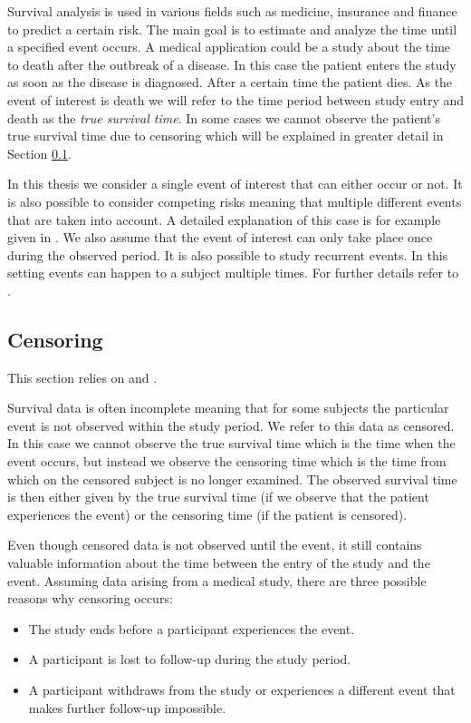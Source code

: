 \documentclass[12pt, a4paper]{scrartcl}
\theoremstyle{definition}
\theoremstyle{plain}
\numberwithin{equation}{section}
\numberwithin{figure}{section}
\numberwithin{table}{section}
\begin{document}
	Survival analysis is used in various fields such as medicine, insurance and finance to predict a certain risk.
	The main goal is to estimate and analyze the time until a specified event occurs.
	A medical application could be a study about the time to death after the outbreak of a disease.
	In this case the patient enters the study as soon as the disease is diagnosed.
	After a certain time the patient dies.
	As the event of interest is death we will refer to the time period between study entry and death as the \emph{true survival time}.
	In some cases we cannot observe the patient's true survival time due to censoring which will be explained in greater detail in Section \ref{censoring}.
	
	In this thesis we consider a single event of interest that can either occur or not.
	It is also possible to consider competing risks meaning that multiple different events that are taken into account.
	A detailed explanation of this case is for example given in \citet*[Chapter~8]{bookfailuretime}.
	We also assume that the event of interest can only take place once during the observed period.
	It is also possible to study recurrent events.
	In this setting events can happen to a subject multiple times.
	For further details refer to \citet*[Chapter~9]{bookfailuretime}.
	
	\subsection{Censoring} \label{censoring}
	
	This section relies on \citet*{sabook} and \citet*{mathsabook}.
	
	Survival data is often incomplete meaning that for some subjects the particular event is not observed within the study period.
	We refer to this data as censored.
	In this case we cannot observe the true survival time which is the time when the event occurs, but instead we observe the censoring time which is the time from which on the censored subject is no longer examined.
	The observed survival time is then either given by the true survival time (if we observe that the patient experiences the event) or the censoring time (if the patient is censored).
	
	Even though censored data is not observed until the event, it still contains valuable information about the time between the entry of the study and the event.
	Assuming data arising from a medical study, there are three possible reasons why censoring occurs:
	\begin{itemize}
		\item The study ends before a participant experiences the event.
		\item A participant is lost to follow-up during the study period. %
		\item A participant withdraws from the study or experiences a different event that makes further follow-up impossible.
	\end{itemize}
\end{document}
